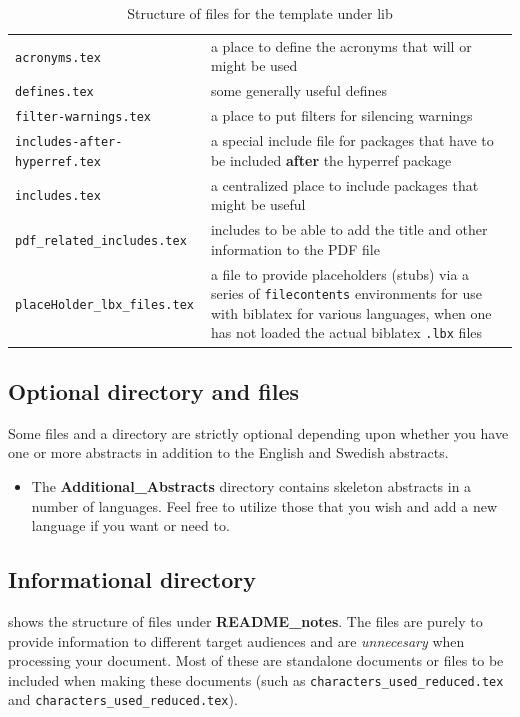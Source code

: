 \documentclass[12pt, twoside]{article}
\newcommand{\dname}[1]{\textbf{#1}}
\newcommand{\fname}[1]{\texttt{#1}}
\begin{document}
\clearpage
\begin{table}[!ht]
    \caption{Structure of files for the template under lib}
    \label{tab:file_structure_lib}
    \begin{tabular}{L{7.5cm}<{\footnotesize} L{6cm}}
\hline
\fname{acronyms.tex} & a place to define the acronyms that will or might be used \\
\fname{defines.tex} & some generally useful defines \\
\fname{filter-warnings.tex} & a place to put filters for silencing warnings \\
\fname{includes-after-hyperref.tex} & a special include file for packages that have to be included \textbf{after} the hyperref package \\
\fname{includes.tex} & a centralized place to include packages that might be useful \\
\fname{pdf\_related\_includes.tex} & includes to be able to add the title and other information to the \gls{PDF} file \\
\fname{placeHolder\_lbx\_files.tex} & a file to provide placeholders (stubs) via a series of \texttt{filecontents} environments for use with biblatex for various languages, when one has not loaded the actual biblatex \fname{.lbx} files\\
\end{tabular}
\end{table}
\FloatBarrier

\subsection{Optional directory and files}
Some files and a directory are strictly optional depending upon whether you have one or more abstracts in addition to the English and Swedish abstracts.
\begin{itemize}
    \item The \dname{Additional\_Abstracts} directory contains skeleton abstracts in a number of languages. Feel free to utilize those that you wish and add a new language if you want or need to.
\end{itemize}


\subsection{Informational directory}

 shows the structure of files under \dname{README\_notes}. The files are purely to provide information to different target audiences and are \textit{unnecesary} when processing your document. Most of these are standalone documents or files to be included when making these documents (such as \fname{characters\_used\_reduced.tex} and
\fname{characters\_used\_reduced.tex}).
\end{document}
